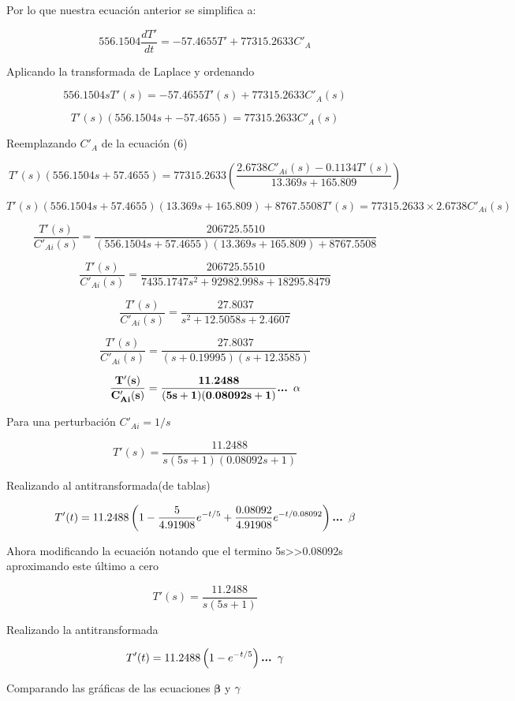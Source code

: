 \documentclass[
  letterpaper,
  DIV=11,
  numbers=noendperiod]{scrreprt}
\begin{document}
Por lo que nuestra ecuación anterior se simplifica a:

\[
556.1504\frac{dT'}{dt}=-57.4655T'+77315.2633C'_A
\]

Aplicando la transformada de Laplace y ordenando

\[
556.1504sT'(s)=-57.4655T'(s)+77315.2633C'_A(s)
\]

\[
T'(s)(556.1504s+-57.4655)=77315.2633C'_A(s)
\]

Reemplazando \(C'_A\) de la ecuación (6)

\[
T'(s)(556.1504s+57.4655)=77315.2633\left(\frac{2.6738C'_{Ai}(s)-0.1134T'(s)}{13.369s+165.809}\right)
\]

\[
T'(s)(556.1504s+57.4655)(13.369s+165.809)+8767.5508T'(s)=77315.2633\times 2.6738C'_{Ai}(s)
\]

\[
\frac{T'(s)}{C'_{Ai}(s)}=\frac{206725.5510}{(556.1504s+57.4655)(13.369s+165.809)+8767.5508}
\]

\[
\frac{T'(s)}{C'_{Ai}(s)}=\frac{206725.5510}{7435.1747s^2+92982.998s+18295.8479}
\]

\[
\frac{T'(s)}{C'_{Ai}(s)}=\frac{27.8037}{s^2+12.5058s+2.4607}
\]

\[
\frac{T'(s)}{C'_{Ai}(s)}=\frac{27.8037}{(s+0.19995)(s+12.3585)}
\]

\[
\mathbf{\frac{T'(s)}{C'_{Ai}(s)}=\frac{11.2488}{(5s+1)(0.08092s+1)}}\space\space\space\space\textbf{... }\mathbf{\alpha}
\]

Para una perturbación \(C'_{Ai}=1/s\)

\[
T'(s)=\frac{11.2488}{s(5s+1)(0.08092s+1)}
\]

Realizando al antitransformada(de tablas)

\[
T'(t)=11.2488\left(1-\frac{5}{4.91908}e^{-t/5}+\frac{0.08092}{4.91908}e^{-t/0.08092}\right)\space\space\space\space\textbf{... }\mathbf{\beta}
\]

Ahora modificando la ecuación notando que el termino
5s\textgreater\textgreater0.08092s aproximando este último a cero

\[
T'(s)=\frac{11.2488}{s(5s+1)}
\]

Realizando la antitransformada

\[
T'(t)=11.2488\left(1-e^{-t/5}\right)\space\space\space\space\textbf{... }\mathbf{\gamma}
\]

Comparando las gráficas de las ecuaciones \(\mathbf{\beta}\) y
\(\space\mathbf{\gamma}\)
\end{document}
